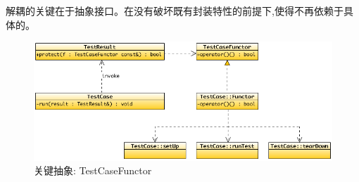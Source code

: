 \begin{content}
解耦的关键在于抽象接口。在没有破坏既有封装特性的前提下,使得不再依赖于具体的。

\begin{figure}[H]
\centering
\includegraphics[width=1.0\textwidth]{figures/xunit/test-case-functor-1.png}
\caption{关键抽象: TestCaseFunctor}
 \label{fig:test-case-functor-1}
\end{figure}

\end{content}














